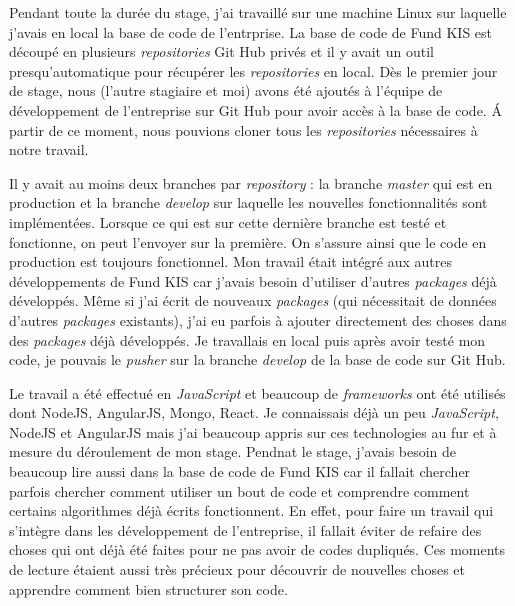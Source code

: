 Pendant toute la durée du stage, j'ai travaillé sur une machine Linux sur laquelle j'avais en local la base de code de l'entrprise. La base de code de Fund KIS est découpé en plusieurs \textit{repositories} Git Hub privés et il y avait un outil presqu'automatique pour récupérer les \textit{repositories} en local. Dès le premier jour de stage, nous (l'autre stagiaire et moi) avons été ajoutés à l'équipe de développement de l'entreprise sur Git Hub pour avoir accès à la base de code. \'A partir de ce moment, nous pouvions cloner tous les \textit{repositories} nécessaires à notre travail.


\vspace{3mm}
Il y avait au moins deux branches par \textit{repository} : la branche \textit{master} qui est en production et la branche \textit{develop} sur laquelle les nouvelles fonctionnalités sont implémentées. Lorsque ce qui est sur cette dernière branche est testé et fonctionne, on peut l'envoyer sur la première. On s'assure ainsi que le code en production est toujours fonctionnel. Mon travail était intégré aux autres développements de Fund KIS car j'avais besoin d'utiliser d'autres \textit{packages} déjà développés. Même si j'ai écrit de nouveaux \textit{packages} (qui nécessitait de données d'autres \textit{packages} existants), j'ai eu parfois à ajouter directement des choses dans des \textit{packages} déjà développés. Je travallais en local puis après avoir testé mon code, je pouvais le \textit{pusher} sur la branche \textit{develop} de la base de code sur Git Hub.

\vspace{3mm}

Le travail a été effectué en \textit{JavaScript} et beaucoup de \textit{frameworks} ont été utilisés dont NodeJS, AngularJS, Mongo, React. Je connaissais déjà un peu \textit{JavaScript}, NodeJS et AngularJS mais j'ai beaucoup appris sur ces technologies au fur et à mesure du déroulement de mon stage. Pendnat le stage, j'avais besoin de beaucoup lire aussi dans la base de code de Fund KIS car il fallait chercher parfois chercher comment utiliser un bout de code et comprendre comment certains algorithmes déjà écrits fonctionnent. En effet, pour faire un travail qui s'intègre dans les développement de l'entreprise, il fallait éviter de refaire des choses qui ont déjà été faites pour ne pas avoir de codes dupliqués. Ces moments de lecture étaient aussi très précieux pour découvrir de nouvelles choses et apprendre comment bien structurer son code.

